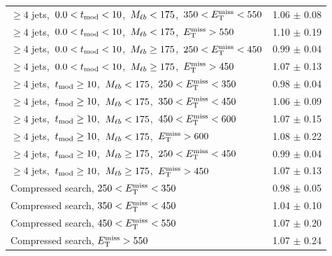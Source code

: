 \begin{table}[htbp]
\begin{tabular}{|l|c|}
$\ge4$ jets,~$0.0< t_\text{mod} <10$,~$M_{\ell b}<175$,~$350<E_\text{T}^\text{miss}<550$   &  1.06 $\pm$ 0.08 \\
$\ge4$ jets,~$0.0< t_\text{mod} <10$,~$M_{\ell b}<175$,~$E_\text{T}^\text{miss}>550$       &  1.10 $\pm$ 0.19 \\
\hline
$\ge4$ jets,~$0.0< t_\text{mod} <10$,~$M_{\ell b}\ge175$,~$250<E_\text{T}^\text{miss}<450$ &  0.99 $\pm$ 0.04 \\
$\ge4$ jets,~$0.0< t_\text{mod} <10$,~$M_{\ell b}\ge175$,~$E_\text{T}^\text{miss}>450$     &  1.07 $\pm$ 0.13 \\
\hline
$\ge4$ jets,~$t_\text{mod} \ge10$,~$M_{\ell b}<175$,~$250<E_\text{T}^\text{miss}<350$      &  0.98 $\pm$ 0.04 \\
$\ge4$ jets,~$t_\text{mod} \ge10$,~$M_{\ell b}<175$,~$350<E_\text{T}^\text{miss}<450$      &  1.06 $\pm$ 0.09 \\
$\ge4$ jets,~$t_\text{mod} \ge10$,~$M_{\ell b}<175$,~$450<E_\text{T}^\text{miss}<600$      &  1.07 $\pm$ 0.15 \\
$\ge4$ jets,~$t_\text{mod} \ge10$,~$M_{\ell b}<175$,~$E_\text{T}^\text{miss}>600$          &  1.08 $\pm$ 0.22 \\
\hline
$\ge4$ jets,~$t_\text{mod} \ge10$,~$M_{\ell b}\ge175$,~$250<E_\text{T}^\text{miss}<450$    &  0.99 $\pm$ 0.04 \\
$\ge4$ jets,~$t_\text{mod} \ge10$,~$M_{\ell b}\ge175$,~$E_\text{T}^\text{miss}>450$        &  1.07 $\pm$ 0.13 \\
\hline
Compressed search, $250<E_\text{T}^\text{miss}<350$                           &  0.98 $\pm$ 0.05 \\
Compressed search, $350<E_\text{T}^\text{miss}<450$                           &  1.04 $\pm$ 0.10 \\
Compressed search, $450<E_\text{T}^\text{miss}<550$                           &  1.07 $\pm$ 0.20 \\
Compressed search, $E_\text{T}^\text{miss}>550$                               &  1.07 $\pm$ 0.24 \\
\hline
\end{tabular}
\end{table}
